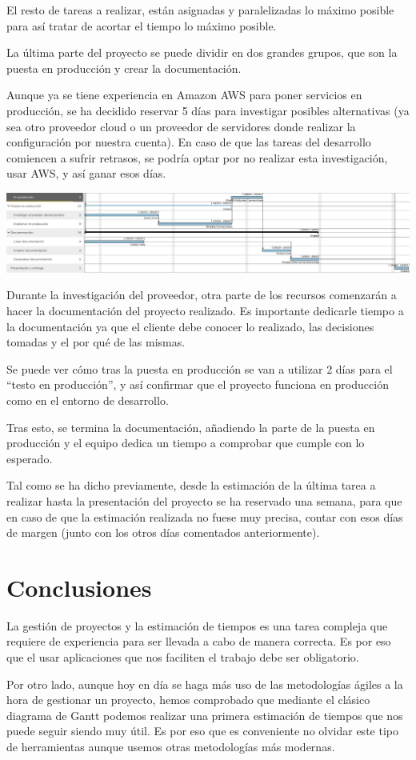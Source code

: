 \documentclass{\ClassPath/viu-tfm-template}
\begin{document}
El resto de tareas a realizar, están asignadas y paralelizadas lo máximo posible para así tratar de acortar el tiempo lo máximo posible.

La última parte del proyecto se puede dividir en dos grandes grupos, que son la puesta en producción y crear la documentación.

Aunque ya se tiene experiencia en Amazon AWS para poner servicios en producción, se ha decidido reservar 5 días para investigar posibles alternativas (ya sea otro proveedor cloud o un proveedor de servidores donde realizar la configuración por nuestra cuenta). En caso de que las tareas del desarrollo comiencen a sufrir retrasos, se podría optar por no realizar esta investigación, usar AWS, y así ganar esos días.

\begin{center}
    \includegraphics[frame,width=\linewidth]{img/gantt3.png}
\end{center}

Durante la investigación del proveedor, otra parte de los recursos comenzarán a hacer la documentación del proyecto realizado. Es importante dedicarle tiempo a la documentación ya que el cliente debe conocer lo realizado, las decisiones tomadas y el por qué de las mismas.

Se puede ver cómo tras la puesta en producción se van a utilizar 2 días para el “testo en producción”, y así confirmar que el proyecto funciona en producción como en el entorno de desarrollo.

Tras esto, se termina la documentación, añadiendo la parte de la puesta en producción y el equipo dedica un tiempo a comprobar que cumple con lo esperado.

Tal como se ha dicho previamente, desde la estimación de la última tarea a realizar hasta la presentación del proyecto se ha reservado una semana, para que en caso de que la estimación realizada no fuese muy precisa, contar con esos días de margen (junto con los otros días comentados anteriormente).


\chapter{Conclusiones}

La gestión de proyectos y la estimación de tiempos es una tarea compleja que requiere de experiencia para ser llevada a cabo de manera correcta. Es por eso que el usar aplicaciones que nos faciliten el trabajo debe ser obligatorio.

Por otro lado, aunque hoy en día se haga más uso de las metodologías ágiles a la hora de gestionar un proyecto, hemos comprobado que mediante el clásico diagrama de Gantt podemos realizar una primera estimación de tiempos que nos puede seguir siendo muy útil. Es por eso que es conveniente no olvidar este tipo de herramientas aunque usemos otras metodologías más modernas.
\end{document}
